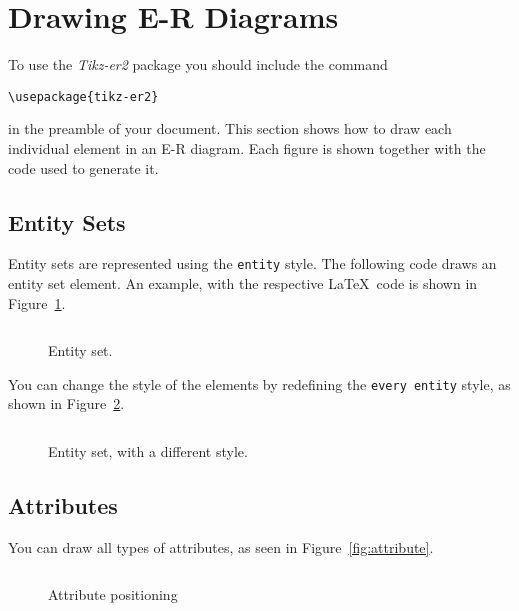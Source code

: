 \documentclass[12pt]{article}
\newcommand{\demo}[1]{
  \bigskip
  \begin{minipage}{\linewidth}
      \begin{center}
          
      \end{center}
      \begin{center}
          \scriptsize
          \inputminted{latex}{snippets/#1.tex}
      \end{center}
  \end{minipage}
}
\begin{document}
\section{Drawing E-R Diagrams}
\label{sec:drawing-e-r}

To use the \emph{Tikz-er2} package you should include the command
\begin{center}
    \ttfamily
    \verb+\usepackage{tikz-er2}+
\end{center}
in the preamble of your document. This section shows how to draw each individual
element in an E-R diagram. Each figure is shown together with the code used to
generate it.

%

\subsection{Entity Sets}
\label{sec:entities}

Entity sets are represented using the \texttt{entity} style. The following code
draws an entity set element. An example, with the respective \LaTeX\ code is
shown in Figure~\ref{fig:entity}.

\begin{figure}[htb!]
    \centering
    \demo{entity}
    \caption{Entity set.}
\label{fig:entity}
\end{figure}

You can change the style of the elements by redefining the \texttt{every
  entity} style, as shown in Figure~\ref{fig:entity-blue}.

\begin{figure}[htb!]
    \centering
    \demo{entity-blue}
    \caption{Entity set, with a different style.}
\label{fig:entity-blue}
\end{figure}

%

\subsection{Attributes}
\label{sec:attributes}

You can draw all types of attributes, as seen in Figure~\ref{fig:attribute}.

\begin{figure}[htb!]
    \centering
    \demo{attribute-positioning}
    \caption{Attribute positioning}
\label{fig:attribute-positioning}
\end{figure}
\end{document}
